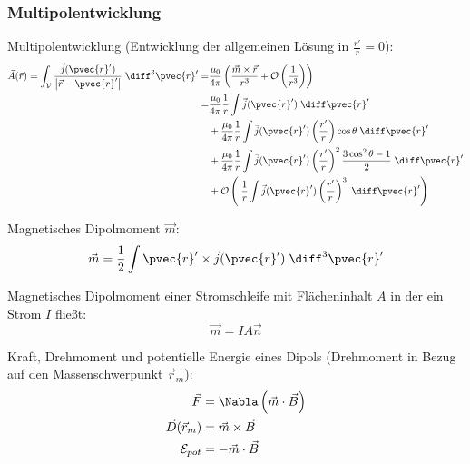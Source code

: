 \documentclass[11pt]{article}
\numberwithin{equation}{section}
\begin{document}
      \subsubsection{Multipolentwicklung}
        Multipolentwicklung (Entwicklung der allgemeinen Lösung in $\frac{r'}{r}=0$):
        \begin{equation}
          \begin{aligned}
            \vec{A}(\vec{r}) = \int_{\mathcal{V}} \frac{\vec{j}(\pvec{r}')}{\left|\vec{r}-\pvec{r}'\right|} \;\diff^3\pvec{r}'
            =& \frac{\mu_0}{4\pi} \left(\frac{\vec{m}\times\vec{r}}{r^3} + \mathcal{O}\left(\frac{1}{r^3}\right)\right) \\
            =& \frac{\mu_0}{4\pi}\frac{1}{r}\int\vec{j}(\pvec{r}')\;\diff \pvec{r}' \\
            &+ \frac{\mu_0}{4\pi}\frac{1}{r}\int\vec{j}(\pvec{r}')\left(\frac{r'}{r}\right)\cos\theta\;\diff \pvec{r}' \\
            &+ \frac{\mu_0}{4\pi}\frac{1}{r}\int\vec{j}(\pvec{r}')\left(\frac{r'}{r}\right)^2\frac{3\cos^2\theta-1}{2}\;\diff \pvec{r}' \\
            &+ \mathcal{O}\left(\;\frac{1}{r}\int\vec{j}(\pvec{r}')\left(\frac{r'}{r}\right)^3 \;\diff \pvec{r}'\right) \\
          \end{aligned}
        \end{equation}

        Magnetisches Dipolmoment $\vec{m}$:
        \begin{equation}
          \begin{aligned}
            \vec{m} = \frac{1}{2}\int \pvec{r}'\times\vec{j}(\pvec{r}')\;\diff^3\pvec{r}'
          \end{aligned}
        \end{equation}

        Magnetisches Dipolmoment einer Stromschleife mit Flächeninhalt $A$ in der ein Strom $I$ fließt:
        \begin{equation}
          \vec{m} = IA\vec{n}
        \end{equation}

        Kraft, Drehmoment und potentielle Energie eines Dipols (Drehmoment in Bezug auf den Massenschwerpunkt $\vec{r}_m$):
        \begin{equation}
          \begin{aligned}
            \vec{F} &= \Nabla\left(\vec{m}\cdot\vec{B}\right) \\
            \vec{D}(\vec{r}_m) &= \vec{m}\times\vec{B} \\
            \mathcal{E}_{pot} &= -\vec{m}\cdot\vec{B} \\
          \end{aligned}
        \end{equation}
\end{document}

